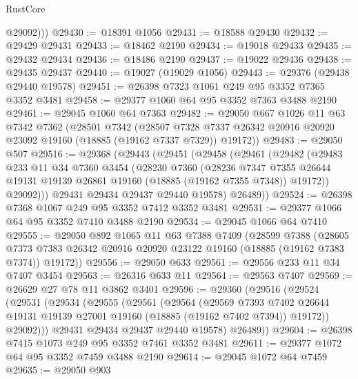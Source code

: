 \begin{lexlean}{RustCore}
\begin{coremodule}
          @29092)))
@29430 := @18391 @1056
@29431 := @18588 @29430
@29432 := @29429 @29431
@29433 := @18462 @2190
@29434 := @19018 @29433
@29435 := @29432 @29434
@29436 := @18486 @2190
@29437 := @19022 @29436
@29438 := @29435 @29437
@29440 := @19027 (@19029 @1056)
@29443 := @29376 (@29438 @29440 @19578)
@29451 := @26398 @7323 @1061 @249 @95 @3352 @7365 @3352 @3481
@29458 := @29377 @1060 @64 @95 @3352 @7363 @3488 @2190
@29461 := @29045 @1060 @64 @7363
@29482 := @29050
    @667
    @1026
    @11
    @63
    @7342
    @7362
    (@28501
      @7342
      (@28507 @7328 @7337 @26342 @20916 @20920 @23092 @19160 (@18885 (@19162 @7337 @7329)) @19172))
@29483 := @29050 @507
@29516 := @29368
    (@29443
      (@29451
        (@29458
          (@29461
            (@29482
              (@29483
                @233
                @11
                @34
                @7360
                @3454
                (@28230
                  @7360
                  (@28236
                    @7347
                    @7355
                    @26644
                    @19131
                    @19139
                    @26861
                    @19160
                    (@18885 (@19162 @7355 @7348))
                    @19172))
                @29092)))
          @29431
          @29434
          @29437
          @29440
          @19578)
        @26489))
@29524 := @26398 @7368 @1067 @249 @95 @3352 @7412 @3352 @3481
@29531 := @29377 @1066 @64 @95 @3352 @7410 @3488 @2190
@29534 := @29045 @1066 @64 @7410
@29555 := @29050
    @892
    @1065
    @11
    @63
    @7388
    @7409
    (@28599
      @7388
      (@28605 @7373 @7383 @26342 @20916 @20920 @23122 @19160 (@18885 (@19162 @7383 @7374)) @19172))
@29556 := @29050 @633
@29561 := @29556 @233 @11 @34 @7407 @3454
@29563 := @26316 @633 @11
@29564 := @29563 @7407
@29569 := @26629 @27 @78 @11 @3862 @3401
@29596 := @29360
    (@29516
      (@29524
        (@29531
          (@29534
            (@29555
              (@29561
                (@29564
                  (@29569
                    @7393
                    @7402
                    @26644
                    @19131
                    @19139
                    @27001
                    @19160
                    (@18885 (@19162 @7402 @7394))
                    @19172))
                @29092)))
          @29431
          @29434
          @29437
          @29440
          @19578)
        @26489))
@29604 := @26398 @7415 @1073 @249 @95 @3352 @7461 @3352 @3481
@29611 := @29377 @1072 @64 @95 @3352 @7459 @3488 @2190
@29614 := @29045 @1072 @64 @7459
@29635 := @29050
    @903

\end{coremodule}
\end{lexlean}
